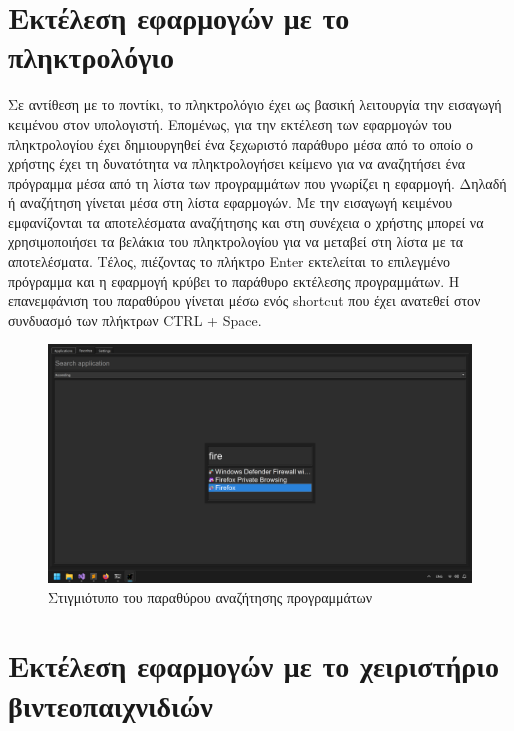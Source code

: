 \section{Εκτέλεση εφαρμογών με το πληκτρολόγιο}

Σε αντίθεση με το ποντίκι, το πληκτρολόγιο έχει ως βασική λειτουργία την εισαγωγή κειμένου στον
υπολογιστή. Επομένως, για την εκτέλεση των εφαρμογών του πληκτρολογίου έχει δημιουργηθεί 
ένα ξεχωριστό παράθυρο μέσα από το οποίο ο χρήστης έχει τη δυνατότητα να πληκτρολογήσει κείμενο για
να αναζητήσει ένα πρόγραμμα μέσα από τη λίστα των προγραμμάτων που γνωρίζει η εφαρμογή. Δηλαδή ή αναζήτηση
γίνεται μέσα στη λίστα εφαρμογών. Με την εισαγωγή κειμένου εμφανίζονται τα αποτελέσματα
αναζήτησης και στη συνέχεια ο χρήστης μπορεί να χρησιμοποιήσει τα βελάκια του πληκτρολογίου
για να μεταβεί στη λίστα με τα αποτελέσματα. Τέλος, πιέζοντας το πλήκτρο Enter εκτελείται το
επιλεγμένο πρόγραμμα και η εφαρμογή κρύβει το παράθυρο εκτέλεσης προγραμμάτων. Η επανεμφάνιση του
παραθύρου γίνεται μέσω ενός shortcut που έχει ανατεθεί στον συνδυασμό των πλήκτρων CTRL + Space. 


\begin{figure}[H]
    \centering
    \includegraphics[width=1.0\textwidth]{./images/window_keyboard_search.png}
    \caption{Στιγμιότυπο του παραθύρου αναζήτησης προγραμμάτων}
\end{figure}


\section{Εκτέλεση εφαρμογών με το χειριστήριο βιντεοπαιχνιδιών}

